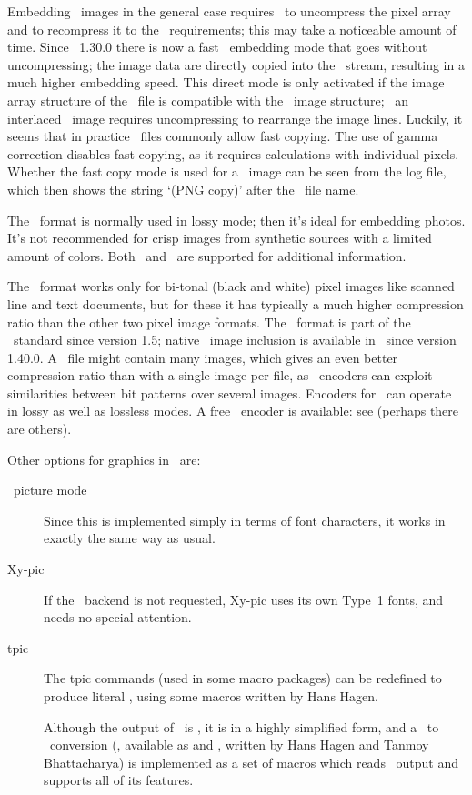 \documentclass{pdftexmanual}
\begin{document}
Embedding \PNG\ images in the general case requires \PDFTEX\ to
uncompress the pixel array and to re\hyph compress it to the \PDF\
requirements; this may take a noticeable amount of time. Since \PDFTEX\
1.30.0 there is now a fast \PNG\ embedding mode that goes without
uncompressing; the image data are directly copied into the \PDF\ stream,
resulting in a much higher embedding speed. This direct mode is only
activated if the image array structure of the \PNG\ file is compatible
with the \PDF\ image structure; \eg\ an interlaced \PNG\ image requires
uncompressing to re\hyph arrange the image lines. Luckily, it seems that
in practice \PNG\ files commonly allow fast copying. The use of gamma
correction disables fast copying, as it requires calculations with
individual pixels. Whether the fast copy mode is used for a \PNG\ image
can be seen from the log file, which then shows the string `(PNG copy)'
after the \PNG\ file name.

The \JPEG\ format is normally used in lossy mode; then it's ideal for
embedding photos.  It's not recommended for crisp images from synthetic
sources with a limited amount of colors.  Both \JFIF\ and \EXIF\ are
supported for additional information.

The \JBIGTWO\ format works only for bi-tonal (black and white) pixel
images like scanned line and text documents, but for these it has
typically a much higher compression ratio than the other two pixel image
formats. The \JBIGTWO\ format is part of the \PDF\ standard since
version 1.5; native \JBIGTWO\ image inclusion is available in \PDFTEX\
since version 1.40.0. A \JBIGTWO\ file might contain many images, which
gives an even better compression ratio than with a single image per
file, as \JBIGTWO\ encoders can exploit similarities between bit
patterns over several images. Encoders for \JBIGTWO\ can operate in
lossy as well as lossless modes. A free \JBIGTWO\ encoder is available:
see \useurl{jbigenc} (perhaps there are others).

Other options for graphics in \PDFTEX\ are:

\begin{description}
\item[\LATEX\ picture mode] Since this is implemented simply in terms
of font characters, it works in exactly the same way as usual.

\item[Xy-pic] If the \POSTSCRIPT\ backend is not requested, Xy-pic
uses its own Type~1 fonts, and needs no special attention.

\item[tpic] The tpic \cs{special} commands (used in some
macro packages) can be redefined to produce literal \PDF, using some macros
written by Hans Hagen.

\item[\METAPOST] Although the output of \METAPOST\ is
\POSTSCRIPT, it is in a highly simplified form, and a \METAPOST\ to
\PDF\ conversion (\MPTOPDF, available as  and
\type{supp-pdf.mkii}, written by Hans Hagen and Tanmoy Bhattacharya) is
implemented as a set of macros which reads \METAPOST\ output and
supports all of its features.

\end{description}
\end{document}
